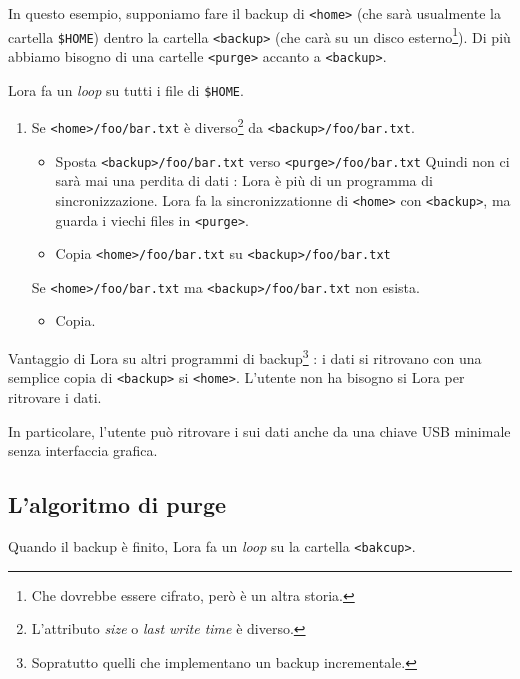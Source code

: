 \documentclass[a4paper,12pt]{article}
\newcommand{\info}[1]{\texttt{#1}}
\begin{document}
In questo esempio, supponiamo fare il backup di \info{<home>} (che sarà usualmente la cartella \info{\$HOME}) dentro la cartella \info{<backup>} (che carà su un disco esterno\footnote{Che dovrebbe essere cifrato, però è un altra storia.}). Di più abbiamo bisogno di una cartelle \info{<purge>} accanto a \info{<backup>}.

Lora fa un \emph{loop} su tutti i file di \info{\$HOME}.

\begin{enumerate}
    \item
        Se \info{<home>/foo/bar.txt} è diverso\footnote{L'attributo \emph{size} o \emph{last write time} è diverso.}  da \info{<backup>/foo/bar.txt}. 
        \begin{itemize}
            \item Sposta \info{<backup>/foo/bar.txt} verso \info{<purge>/foo/bar.txt} Quindi non ci sarà mai una perdita di dati : Lora è più di un programma di sincronizzazione. Lora fa la sincronizzationne di \info{<home>} con \info{<backup>}, ma guarda i viechi files in \info{<purge>}.
            \item Copia \info{<home>/foo/bar.txt} su \info{<backup>/foo/bar.txt}
        \end{itemize}
        Se \info{<home>/foo/bar.txt} ma \info{<backup>/foo/bar.txt} non esista.
        \begin{itemize}
            \item Copia.
        \end{itemize}
\end{enumerate}

Vantaggio di Lora su altri programmi di backup\footnote{Sopratutto quelli che implementano un backup incrementale.} : i dati si ritrovano con una semplice copia di \info{<backup>} si \info{<home>}. L'utente non ha bisogno si Lora per ritrovare i dati. 

In particolare, l'utente può ritrovare i sui dati anche da una chiave USB minimale senza interfaccia grafica. 

\subsection{L'algoritmo di purge}

Quando il backup è finito, Lora fa un \emph{loop} su la cartella \info{<bakcup>}.
\end{document}

